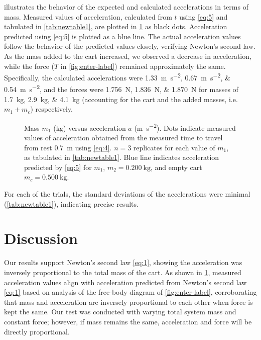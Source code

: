 \documentclass[reprint,amsmath,amssymb,aps,twoside]{revtex4-2}
\begin{document}
 illustrates the behavior of the expected and calculated accelerations in terms of mass. Measured values of acceleration, calculated from $t$ using \cref{eq:5} and tabulated in \ref{tab:newtable1}, are plotted in \cref{fig:graph of acceleration} as black dots. Acceleration predicted using \cref{eq:5} is plotted as a blue line. The actual acceleration values follow the behavior of the predicted values closely, verifying Newton's second law. As the mass added to the cart increased, we observed a decrease in acceleration, while the force ($T$ in \cref{fig:enter-label}) remained approximately the same. Specifically, the calculated accelerations were \qtylist{1.33;0.67;0.54}{\meter\per\second\squared}, and the forces were \qtylist{1.756;1.836;1.870}{\newton} for masses of \qtylist{1.7;2.9;4.1}{\kilo\gram} (accounting for the cart and the added masses, i.e. $m_1+m_c$) respectively. 

\begin{figure}[ht] %
\begin{center}

\end{center}
\caption{\label{fig:graph of acceleration} Mass $m_1$ (\unit{\kilo\gram}) versus acceleration $a$ (\unit{\meter\per\second\squared}). Dots indicate measured values of acceleration obtained from the measured time to travel from rest \qty{0.7}{\meter} using \cref{eq:4}. $n=3$ replicates for each value of $m_1$, as tabulated in \cref{tab:newtable1}. Blue line indicates acceleration predicted by \cref{eq:5} for $m_1$, $m_2=\qty{0.200}{\kilo\gram}$, and empty cart $m_c=\qty{0.500}{\kilo\gram}$.}
\end{figure}

For each of the trials, the standard deviations of the accelerations were minimal (\cref{tab:newtable1}), indicating precise results. 





\section{Discussion}
Our results support Newton's second law \cref{eq:1}, showing the acceleration was inversely proportional to the total mass of the cart. As shown in \cref{fig:graph of acceleration}, measured acceleration values align with acceleration predicted from Newton's second law \cref{eq:1} based on analysis of the free-body diagram of \cref{fig:enter-label}, corroborating that mass and acceleration are inversely proportional to each other when force is kept the same. Our test was conducted with varying total system mass and constant force; however, if mass remains the same, acceleration and force will be directly proportional. 
\end{document}
